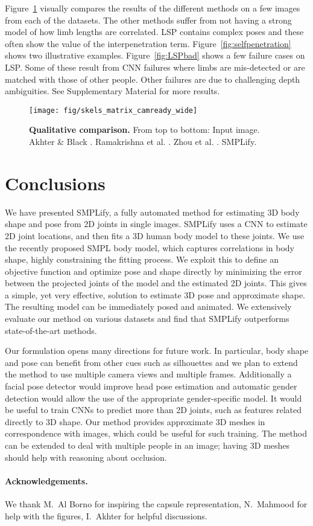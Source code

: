 \documentclass[runningheads]{llncs}
\begin{document}
Figure~\ref{fig:Comparo} visually compares the results of the different methods on a few images from each of the datasets.
The other methods suffer from not having a strong model of how limb
lengths are correlated. LSP contains complex poses and these often show the value of the interpenetration term.
Figure~\ref{fig:selfpenetration} shows two illustrative
examples. Figure~\ref{fig:LSPbad} shows a few failure cases on LSP. 
Some of these result from CNN failures where limbs are mis-detected or are
matched with those of other people. Other failures are due to challenging
depth ambiguities. See Supplementary Material \cite{simplifyweb} for more results.

\begin{figure}[t]
\centerline{
\texttt{[image: fig/skels\_matrix\_camready\_wide]}
}

\caption{{\bf Qualitative comparison.}
From top to bottom:
Input image.
Akhter \& Black \cite{Akhter:2015}.
Ramakrishna et al. \cite{Ramakrishna:2012}.
Zhou et al. \cite{Zhou:2015b}.
SMPLify.
}
\label{fig:Comparo}
\end{figure}
 
\section{Conclusions}
\label{sec:conclusions}
We have presented SMPLify, a fully automated method for estimating 3D body shape and pose from 2D joints in single images.
SMPLify uses a CNN to estimate 2D joint locations, and then fits a 3D human body model to these joints.
We use the recently proposed SMPL body model, which captures correlations in body shape, highly constraining the fitting process. 
We exploit this to define an objective function and optimize pose and shape directly by minimizing the error between the projected joints of the model and the estimated 2D joints. This gives a simple, yet very effective, solution to estimate 3D pose and approximate shape.
The resulting model can be immediately posed and animated.
We extensively evaluate our method on various datasets and find that SMPLify outperforms state-of-the-art methods.



Our formulation opens many directions for future work. 
In particular, body shape and pose can benefit from other cues such as silhouettes and we plan to extend the method to use multiple camera views and multiple frames.
Additionally a facial pose detector would improve head pose estimation and automatic gender detection would allow the use of the appropriate gender-specific model.
It would be useful to train CNNs to predict more than 2D joints, such as features related directly to 3D shape.
Our method provides approximate 3D meshes in correspondence with images, which could be useful for such training.
The method can be extended to deal with multiple people in an image; having 3D meshes should help with reasoning about occlusion.


\paragraph{Acknowledgements.}  We thank M.~Al Borno for inspiring the capsule representation, N.~Mahmood for help with the figures, I.~Akhter for helpful discussions.
 
\par\vfill\par


\clearpage



\end{document}
